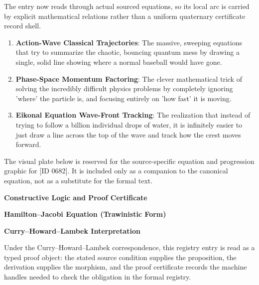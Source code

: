 The entry now reads through actual sourced equations, so its local arc is carried by explicit mathematical relations rather than a uniform quaternary certificate record shell.
\endgroup

\begin{enumerate}[leftmargin=1.6em,itemsep=6pt,topsep=4pt]
\item \textbf{Action-Wave Classical Trajectories}: The massive, sweeping equations that try to summarize the chaotic, bouncing quantum mess by drawing a single, solid line showing where a normal baseball would have gone.
\item \textbf{Phase-Space Momentum Factoring}: The clever mathematical trick of solving the incredibly difficult physics problems by completely ignoring 'where' the particle is, and focusing entirely on 'how fast' it is moving.
\item \textbf{Eikonal Equation Wave-Front Tracking}: The realization that instead of trying to follow a billion individual drops of water, it is infinitely easier to just draw a line across the top of the wave and track how the crest moves forward.
\end{enumerate}

\begingroup\footnotesize\sloppy
The visual plate below is reserved for the source-specific equation and progression graphic for [ID 0682]. It is included only as a companion to the canonical equation, not as a substitute for the formal text.
\par\endgroup
\ifTZPDarkEdition
{}
\fi

\clearpage
\begingroup\tzpsupportsetup
\noindent\textbf{\fontsize{10.8pt}{12.8pt}\selectfont [ID 0682] Constructive Logic and Proof Certificate}\par
\noindent\textbf{\fontsize{10pt}{12pt}\selectfont Hamilton--Jacobi Equation (Trawinistic Form)}\par
\vspace{0.45em}
\begingroup
\footnotesize
\setlength{\parskip}{0.22em}
\setlength{\parindent}{0pt}
\noindent\textbf{Curry--Howard--Lambek Interpretation}\par
Under the Curry--Howard--Lambek correspondence, this registry entry is read as a typed proof
object: the stated source condition supplies the proposition, the derivation supplies the
morphism, and the proof certificate records the machine handles needed to check the obligation
in the formal registry.

